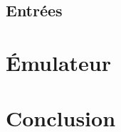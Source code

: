 \documentclass[a4paper]{article}
\begin{document}

\subsection{Entrées}


\section{Émulateur}


\section{Conclusion}
\end{document}
